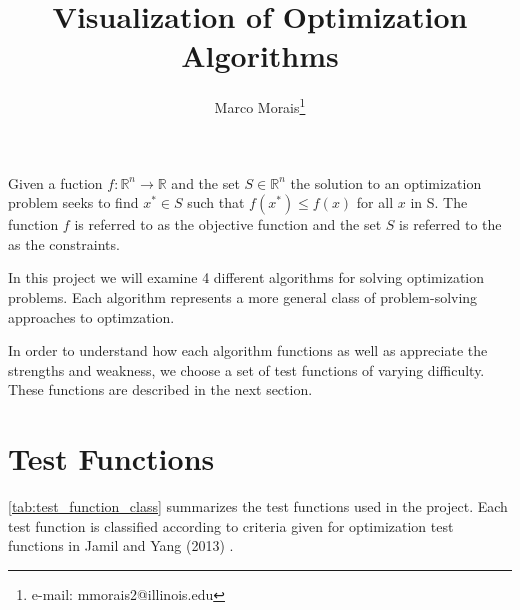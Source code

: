 \documentclass{vgtc}                          %
\title{Visualization of Optimization Algorithms}
\author{Marco Morais\thanks{e-mail: mmorais2@illinois.edu}}
\affiliation{\scriptsize University of Illinois at Urbana–Champaign}
\begin{document}


\maketitle

Given a fuction $f: \mathbb{R}^n \rightarrow \mathbb{R}$ and the set $S \in \mathbb{R}^n$ the solution to an optimization problem seeks to find $x^{*} \in S$ such that $f(x^{*}) \leq f(x)$ for all $x$ in S.  The function $f$ is referred to as the objective function and the set $S$ is referred to the as the constraints.

In this project we will examine 4 different algorithms for solving optimization problems. Each algorithm represents a more general class of problem-solving approaches to optimzation.

In order to understand how each algorithm functions as well as appreciate the strengths and weakness, we choose a set of test functions of varying difficulty. These functions are described in the next section.

\section{Test Functions}

\autoref{tab:test_function_class} summarizes the test functions used in the project. Each test function is classified according to criteria given for optimization test functions in Jamil and Yang (2013) \cite{Jamil:2013:CoRR}.
\end{document}
